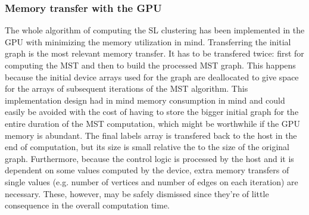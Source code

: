 \subsubsection{Memory transfer with the GPU}
The whole algorithm of computing the SL clustering has been implemented in the GPU with minimizing the memory utilization in mind.
Transferring the initial graph is the most relevant memory transfer.
It has to be transfered twice: first for computing the MST and then to build the processed MST graph.
This happens because the initial device arrays used for the graph are deallocated to give space for the arrays of subsequent iterations of the MST algorithm.
This implementation design had in mind memory consumption in mind and could easily be avoided with the cost of having to store the bigger initial graph for the entire duration of the MST computation, which might be worthwhile if the GPU memory is abundant.
The final labels array is transfered back to the host in the end of computation, but its size is small relative the to the size of the original graph.
Furthermore, because the control logic is processed by the host and it is dependent on some values computed by the device, extra memory transfers of single values (e.g. number of vertices and number of edges on each iteration) are necessary.
These, however, may be safely dismissed since they're of little consequence in the overall computation time.


